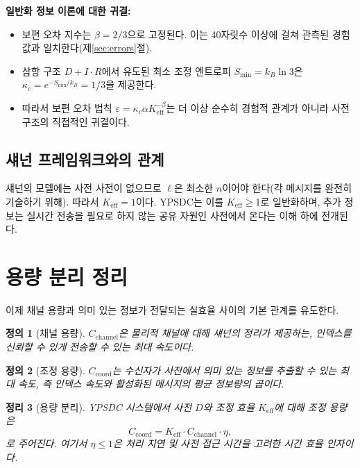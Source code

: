 \documentclass[12pt,a4paper]{article}
\newcommand{\Keff}{K_{\mathrm{eff}}}
\newtheorem{theorem}{정리}[section]
\newtheorem{definition}[theorem]{정의}
\begin{document}
	\textbf{일반화 정보 이론에 대한 귀결:}
	\begin{itemize}
		\item 보편 오차 지수는 $\beta = 2/3$으로 고정된다. 이는 40자릿수 이상에 걸쳐 관측된 경험값과 일치한다(제\ref{sec:errors}절).
		\item 삼항 구조 $D+I\!\cdot\!R$에서 유도된 최소 조정 엔트로피 $S_{\min} = k_B \ln 3$은 $\kappa_c = e^{-S_{\min}/k_B} = 1/3$을 제공한다.
		\item 따라서 보편 오차 법칙 $\varepsilon = \kappa_c \alpha K_{\mathrm{eff}}^{-\beta}$는 더 이상 순수히 경험적 관계가 아니라 사전 구조의 직접적인 귀결이다.
	\end{itemize}
	
	\subsection{섀넌 프레임워크와의 관계}
	
	섀넌의 모델에는 사전 사전이 없으므로 $\ell$은 최소한 $n$이어야 한다(각 메시지를 완전히 기술하기 위해). 따라서 $\Keff = 1$이다. YPSDC는 이를 $\Keff \ge 1$로 일반화하며, 추가 정보는 실시간 전송을 필요로 하지 않는 공유 자원인 사전에서 온다는 이해 하에 전개된다.
	
	\section{용량 분리 정리}
	\label{sec:separation}
	
	이제 채널 용량과 의미 있는 정보가 전달되는 실효율 사이의 기본 관계를 유도한다.
	
	\begin{definition}[채널 용량]
		$C_{\text{channel}}$은 물리적 채널에 대해 섀넌의 정리가 제공하는, 인덱스를 신뢰할 수 있게 전송할 수 있는 최대 속도이다.
	\end{definition}
	
	\begin{definition}[조정 용량]
		$C_{\text{coord}}$는 수신자가 사전에서 의미 있는 정보를 추출할 수 있는 최대 속도, 즉 인덱스 속도와 활성화된 메시지의 평균 정보량의 곱이다.
	\end{definition}
	
	\begin{theorem}[용량 분리]
		YPSDC 시스템에서 사전 $D$와 조정 효율 $\Keff$에 대해 조정 용량은
		\begin{equation}
			C_{\text{coord}} = \Keff \cdot C_{\text{channel}} \cdot \eta,
			\label{eq:capacity-separation}
		\end{equation}
		로 주어진다. 여기서 $\eta \le 1$은 처리 지연 및 사전 접근 시간을 고려한 시간 효율 인자이다.
	\end{theorem}
	
\end{document}
